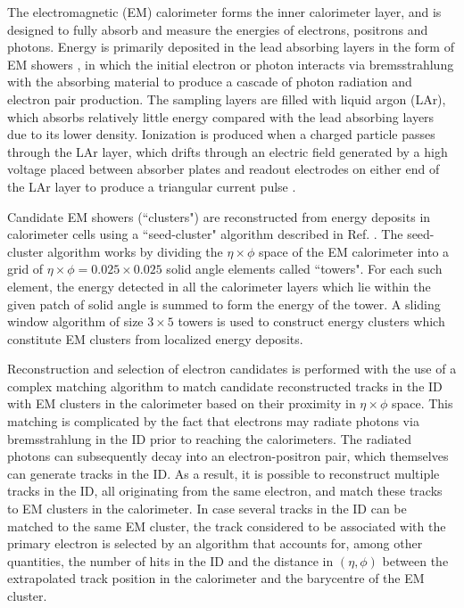 The electromagnetic (EM) calorimeter forms the inner calorimeter layer, and is designed to fully absorb and measure the energies of electrons, positrons and photons. Energy is primarily deposited in the lead absorbing layers in the form of EM showers \cite{em_showers}, in which the initial electron or photon interacts via bremsstrahlung \cite{shower_theory} with the absorbing material to produce a cascade of photon radiation and electron pair production. The sampling layers are filled with liquid argon (LAr), which absorbs relatively little energy compared with the lead absorbing layers due to its lower density. Ionization is produced when a charged particle passes through the LAr \cite{em_cal} layer, which drifts through an electric field generated by a high voltage placed between absorber plates and readout electrodes on either end of the LAr layer to produce a triangular current pulse \cite{LAr_calo}. 

Candidate EM showers (``clusters") are reconstructed from energy deposits in calorimeter cells using a ``seed-cluster" algorithm described in Ref. \cite{electron_reco}. The seed-cluster algorithm works by dividing the \(\eta\times\phi\) space of the EM calorimeter into a grid of \(\eta\times\phi=0.025\times0.025\) solid angle elements called ``towers". For each such element, the energy detected in all the calorimeter layers which lie within the given patch of solid angle is summed to form the energy of the tower. A sliding window algorithm of size \(3\times5\) towers is used to construct energy clusters which constitute EM clusters from localized energy deposits.

Reconstruction and selection of electron candidates \cite{electron_reco} is performed with the use of a complex matching algorithm to match candidate reconstructed tracks in the ID with EM clusters in the calorimeter based on their proximity in \(\eta\times\phi\) space. This matching is complicated by the fact that electrons may radiate photons via bremsstrahlung in the ID prior to reaching the calorimeters. The radiated photons can subsequently decay into an electron-positron pair, which themselves can generate tracks in the ID. As a result, it is possible to reconstruct multiple tracks in the ID, all originating from the same electron, and match these tracks to EM clusters in the calorimeter. In case several tracks in the ID can be matched to the same EM cluster, the track considered to be associated with the primary electron is selected by an algorithm that accounts for, among other quantities, the number of hits in the ID and the distance in \((\eta, \phi)\) between the extrapolated track position in the calorimeter and the barycentre of the EM cluster. 

